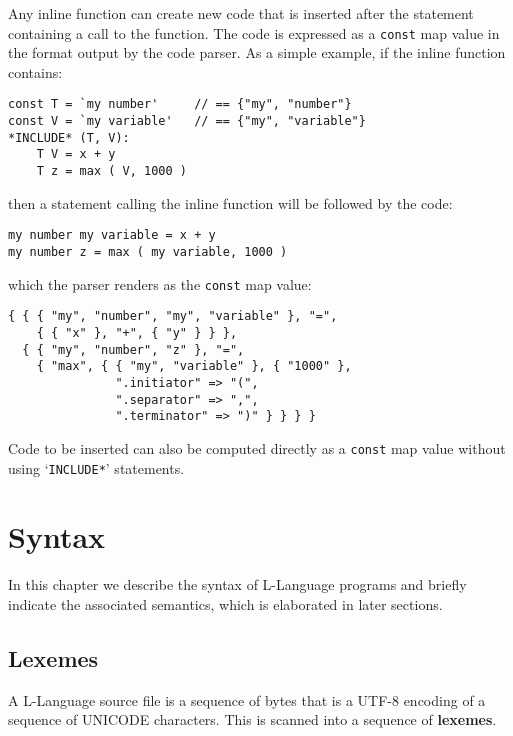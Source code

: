 \documentclass[12pt]{article}
\newcommand{\skey}[2]{{\rm \bfseries #1#2}}
\newenvironment{indpar}[1][0.3in]%
	{\begin{list}{}%
		     {\setlength{\itemsep}{0in}%
		      \setlength{\topsep}{0in}%
		      \setlength{\parsep}{1ex}%
		      \setlength{\labelwidth}{#1}%
		      \setlength{\leftmargin}{#1}%
		      \addtolength{\leftmargin}{\labelsep}}%
	 \item}%
	{\end{list}}
\begin{document}
Any inline function can create new code that is inserted
after the statement containing a call to the function.
The code is expressed as a {\tt const} map value in
the format output by the code parser.  As a simple
example, if the inline function contains:
\begin{indpar}\begin{verbatim}
const T = `my number'     // == {"my", "number"}
const V = `my variable'   // == {"my", "variable"}
*INCLUDE* (T, V):
    T V = x + y
    T z = max ( V, 1000 )
\end{verbatim}\end{indpar}
then a statement calling the inline function will be
followed by the code:
\begin{indpar}\begin{verbatim}
my number my variable = x + y
my number z = max ( my variable, 1000 )
\end{verbatim}\end{indpar}
which the parser renders as the {\tt const} map value:
\begin{indpar}\begin{verbatim}
{ { { "my", "number", "my", "variable" }, "=",
    { { "x" }, "+", { "y" } } },
  { { "my", "number", "z" }, "=",
    { "max", { { "my", "variable" }, { "1000" },
               ".initiator" => "(",
               ".separator" => ",",
               ".terminator" => ")" } } } }
\end{verbatim}\end{indpar}

Code to be inserted can also be computed directly as a {\tt const} map
value without using `{\tt *INCLUDE*}' statements.




\section{Syntax}

In this chapter we describe the syntax of L-Language programs
and briefly indicate the associated semantics, which is
elaborated in later sections.

\subsection{Lexemes}
\label{LEXEMES}

A L-Language source file is a sequence of bytes that is a UTF-8 encoding
of a sequence of UNICODE characters.  This is scanned into a sequence
of \skey{lexeme}s.
\end{document}
